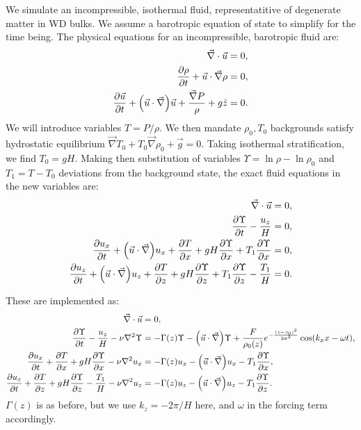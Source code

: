 \documentclass[11pt,
        usenames, %
        dvipsnames %
    ]{article}
\newcommand*{\pd}[2]{\frac{\partial#1}{\partial#2}}
\DeclarePairedDelimiter\p{\lparen}{\rparen}
\begin{document}
We simulate an incompressible, isothermal fluid, representatitive of degenerate
matter in WD bulks. We assume a barotropic equation of state to simplify for the
time being. The physical equations for an incompressible, barotropic fluid are:
\begin{subequations}\label{se:fc_orig}
    \begin{align}
        \vec{\nabla} \cdot \vec{u} &= 0,\\
        \pd{\rho}{t} + \vec{u} \cdot \vec{\nabla}\rho &= 0,\\
        \pd{\vec{u}}{t} + \p*{\vec{u} \cdot \vec{\nabla}}\vec{u}
            + \frac{\vec{\nabla}P}{\rho}
            + g\hat{z} &= 0.
    \end{align}
\end{subequations}
We will introduce variables $T = P/\rho$. We then mandate $\rho_0, T_0$
backgrounds satisfy hydrostatic equilibrium $\vec{\nabla}T_0 + T_0
\vec{\nabla}\rho_0 + \vec{g} = 0$. Taking isothermal stratification, we find
$T_0 = gH$. Making then substitution of variables $\Upsilon = \ln \rho - \ln
\rho_0$ and $T_1 = T - T_0$ deviations from the background state, the exact
fluid equations in the new variables are:
\begin{subequations}\label{se:fc_var}
    \begin{align}
        \vec{\nabla} \cdot \vec{u} &= 0,\\
        \pd{\Upsilon}{t} - \frac{u_z}{H} &= 0,\\
        \pd{u_x}{t} + \p*{\vec{u} \cdot \vec{\nabla}}u_x
            + \pd{T}{x} + gH\pd{\Upsilon}{x}
            + T_1 \pd{\Upsilon}{x} &= 0,\\
        \pd{u_z}{t} + \p*{\vec{u} \cdot \vec{\nabla}}u_z
            + \pd{T}{z} + gH\pd{\Upsilon}{z}
            + T_1 \pd{\Upsilon}{z} - \frac{T_1}{H} &= 0.
    \end{align}
\end{subequations}

These are implemented as:
\begin{subequations}\label{se:curr_num}
    \begin{align}
        \vec{\nabla} \cdot \vec{u} &= 0,\\
        \pd{\Upsilon}{t} - \frac{u_z}{H}
            - \nu \nabla^2 \Upsilon &= -\Gamma(z) \Upsilon
                - \p*{\vec{u} \cdot \vec{\nabla}}\Upsilon
                + \frac{F}{\rho_0(z)}e^{-\frac{(z - z_0)^2}{2\sigma^2}}
                    \cos \p*{k_xx - \omega t},\\
        \pd{u_x}{t} + \pd{T}{x} + gH\pd{\Upsilon}{x}
            - \nu \nabla^2 u_x
            &= -\Gamma(z) u_x
                - \p*{\vec{u} \cdot \vec{\nabla}}u_x
                - T_1 \pd{\Upsilon}{x},\\
        \pd{u_z}{t} + \pd{T}{z} + gH\pd{\Upsilon}{z} - \frac{T_1}{H}
            - \nu \nabla^2 u_z &= -\Gamma(z) u_z
                - \p*{\vec{u} \cdot \vec{\nabla}}u_z
                - T_1 \pd{\Upsilon}{z}.
    \end{align}
\end{subequations}
$\Gamma(z)$ is as before, but we use $k_z = -2\pi/H$ here, and $\omega$ in the
forcing term accordingly.
\end{document}
